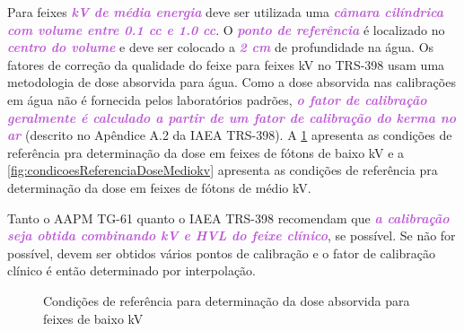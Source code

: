 \documentclass[11pt,a4paper]{article}
\begin{document}
	Para feixes \textcolor{MediumOrchid}{\textbf{\textit{kV de média energia}}} deve ser utilizada uma \textcolor{MediumOrchid}{\textbf{\textit{câmara cilíndrica com volume entre 0.1 cc e 1.0 cc}}}. O \textcolor{MediumOrchid}{\textbf{\textit{ponto de referência}}} é localizado no \textcolor{MediumOrchid}{\textbf{\textit{centro do volume}}} e deve ser colocado a \textcolor{MediumOrchid}{\textbf{\textit{2 cm}}} de profundidade na água. Os fatores de correção da qualidade do feixe para feixes kV no TRS-398 usam uma metodologia de dose absorvida para água. Como a dose absorvida nas calibrações em água não é fornecida pelos laboratórios padrões, \textcolor{MediumOrchid}{\textbf{\textit{o fator de calibração geralmente é calculado a partir de um fator de calibração do kerma no ar}}} (descrito no Apêndice A.2 da IAEA TRS-398). A \ref{fig:condicoesReferenciaDosekv} apresenta as condições de referência pra determinação da dose em feixes de fótons de baixo kV e a \ref{fig:condicoesReferenciaDoseMediokv} apresenta as condições de referência pra determinação da dose em feixes de fótons de médio kV.

	Tanto o AAPM TG-61 quanto o IAEA TRS-398 recomendam que \textcolor{MediumOrchid}{\textbf{\textit{a calibração seja obtida combinando kV e HVL do feixe clínico}}}, se possível. Se não for possível, devem ser obtidos vários pontos de calibração e o fator de calibração clínico é então determinado por interpolação.

	

	\begin{figure}[h]
		\centering
		\caption{Condições de referência para determinação da dose absorvida para feixes de baixo kV}
		\label{fig:condicoesReferenciaDosekv}
	\end{figure}
\end{document}
